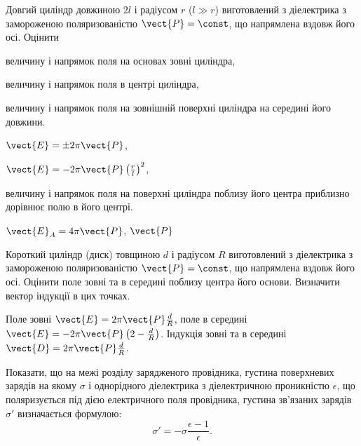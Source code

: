 \begin{problem}
	Довгий циліндр довжиною $2l$  і радіусом $r$ ($l \gg r$) виготовлений з діелектрика з замороженою поляризованістю $\vect{P} = \const$, що напрямлена вздовж його осі. Оцінити
	\begin{enumerate*}[label=\alph*)]
		\item величину і напрямок поля на основах зовні циліндра,
		\item величину і напрямок поля в центрі циліндра,
		\item величину і напрямок поля на зовнішній поверхні циліндра на середині його довжини.
	\end{enumerate*}
	\begin{solution}
		\begin{enumerate*}[label=\alph*)]
			\item $\vect{E} = \pm 2\pi \vect{P}$,
			\item $\vect{E} = -2\pi \vect{P} \left(\frac{r}{l} \right)^2$,
			\item величину і напрямок поля на поверхні циліндра поблизу його центра приблизно дорівнює полю в його центрі.
		\end{enumerate*}
		$\vect{E}_A = 4\pi \vect{P}$, $\vect{P}$
	\end{solution}
\end{problem}


\begin{problem}
	Короткий циліндр (диск) товщиною $d$ і радіусом $R$ виготовлений з діелектрика з замороженою поляризованістю $\vect{P} = \const$, що напрямлена вздовж його осі. Оцінити поле зовні та в середині поблизу центра його основи. Визначити вектор індукції в цих точках.
	\begin{solution}
		Поле зовні $\vect{E} = 2\pi\vect{P}\frac{d}{R}$, поле в середині $\vect{E} = -2\pi\vect{P}\left( 2 - \frac{d}{R}\right) $.
		Індукція зовні та в середині $\vect{D} = 2\pi\vect{P}\frac{d}{R}$.
	\end{solution}
\end{problem}


\begin{problem}
	Показати, що на межі розділу зарядженого провідника, густина поверхневих зарядів на якому $\sigma$ і однорідного діелектрика з діелектричною проникністю $\epsilon$, що поляризується під дією електричного поля провідника, густина зв'язаних зарядів $\sigma'$ визначається формулою:
	\[
		\sigma' = - \sigma\frac{\epsilon - 1}{\epsilon}.
	\]
\end{problem}



